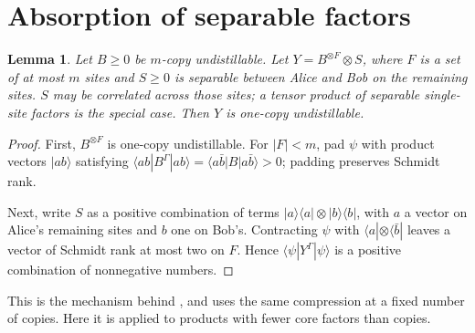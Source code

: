 \documentclass[11pt]{article}
\newtheorem{lemma}[theorem]{Lemma}
\theoremstyle{remark}
\begin{document}
\section{Absorption of separable factors}
\begin{lemma}\label{lem:absorb}
Let $B\ge0$ be $m$-copy undistillable. Let $Y=B^{\otimes F}\otimes S$, where $F$ is a set of at most $m$ sites and
$S\ge0$ is separable between Alice and Bob on the remaining sites. $S$ may be correlated across those sites; a tensor
product of separable single-site factors is the special case. Then $Y$ is one-copy undistillable.
\end{lemma}
\begin{proof}
First, $B^{\otimes F}$ is one-copy undistillable. For $|F|<m$, pad $\psi$ with product vectors $|ab\rangle$ satisfying
$\langle ab|B^\Gamma|ab\rangle=\langle a\bar b|B|a\bar b\rangle>0$; padding preserves Schmidt rank.

Next, write $S$ as a positive combination of terms $|a\rangle\langle a|\otimes|b\rangle\langle b|$, with $a$ a vector
on Alice's remaining sites and $b$ one on Bob's. Contracting $\psi$ with $\langle a|\otimes\langle\bar b|$ leaves a
vector of Schmidt rank at most two on $F$. Hence $\langle\psi|Y^\Gamma|\psi\rangle$ is a positive combination of
nonnegative numbers.
\end{proof}
This is the mechanism behind \cite{DSSTT}, and \cite[Remark~3.2(a)]{MB} uses the same compression at a fixed number of
copies. Here it is applied to products with fewer core factors than copies.
\end{document}
